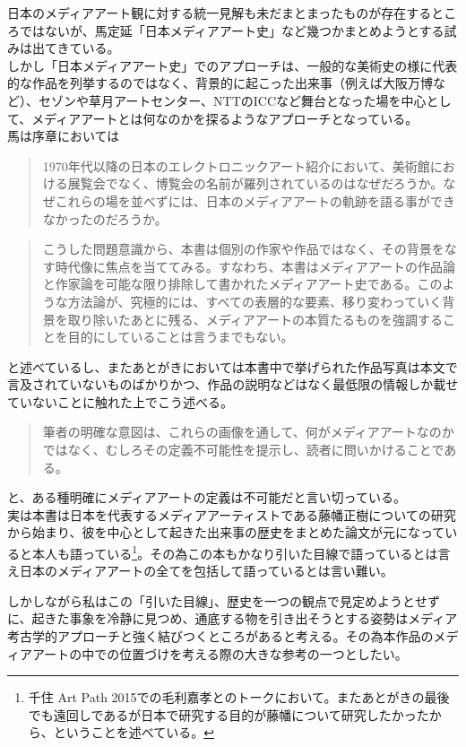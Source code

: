 日本のメディアアート観に対する統一見解も未だまとまったものが存在するところではないが、馬定延「日本メディアアート史」など幾つかまとめようとする試みは出てきている。\\
しかし「日本メディアアート史」でのアプローチは、一般的な美術史の様に代表的な作品を列挙するのではなく、背景的に起こった出来事（例えば大阪万博など）、セゾンや草月アートセンター、NTTのICCなど舞台となった場を中心として、メディアアートとは何なのかを探るようなアプローチとなっている。\\
馬は序章においては

\begin{quote}
1970年代以降の日本のエレクトロニックアート紹介において、美術館における展覧会でなく、博覧会の名前が羅列されているのはなぜだろうか。なぜこれらの場を並べずには、日本のメディアアートの軌跡を語る事ができなかったのだろうか。
\end{quote}

\begin{quote}
こうした問題意識から、本書は個別の作家や作品ではなく、その背景をなす時代像に焦点を当ててみる。すなわち、本書はメディアアートの作品論と作家論を可能な限り排除して書かれたメディアアート史である。このような方法論が、究極的には、すべての表層的な要素、移り変わっていく背景を取り除いたあとに残る、メディアアートの本質たるものを強調することを目的にしていることは言うまでもない。
\end{quote}

と述べているし、またあとがきにおいては本書中で挙げられた作品写真は本文で言及されていないものばかりかつ、作品の説明などはなく最低限の情報しか載せていないことに触れた上でこう述べる。

\begin{quote}
筆者の明確な意図は、これらの画像を通して、何がメディアアートなのかではなく、むしろその定義不可能性を提示し、読者に問いかけることである。
\end{quote}

と、ある種明確にメディアアートの定義は不可能だと言い切っている。\\
実は本書は日本を代表するメディアアーティストである藤幡正樹についての研究から始まり、彼を中心として起きた出来事の歴史をまとめた論文が元になっていると本人も語っている\footnote{千住
  Art Path
  2015での毛利嘉孝とのトークにおいて。またあとがきの最後でも遠回しであるが日本で研究する目的が藤幡について研究したかったから、ということを述べている。}。その為この本もかなり引いた目線で語っているとは言え日本のメディアアートの全てを包括して語っているとは言い難い。

しかしながら私はこの「引いた目線」、歴史を一つの観点で見定めようとせずに、起きた事象を冷静に見つめ、通底する物を引き出そうとする姿勢はメディア考古学的アプローチと強く結びつくところがあると考える。その為本作品のメディアアートの中での位置づけを考える際の大きな参考の一つとしたい。

